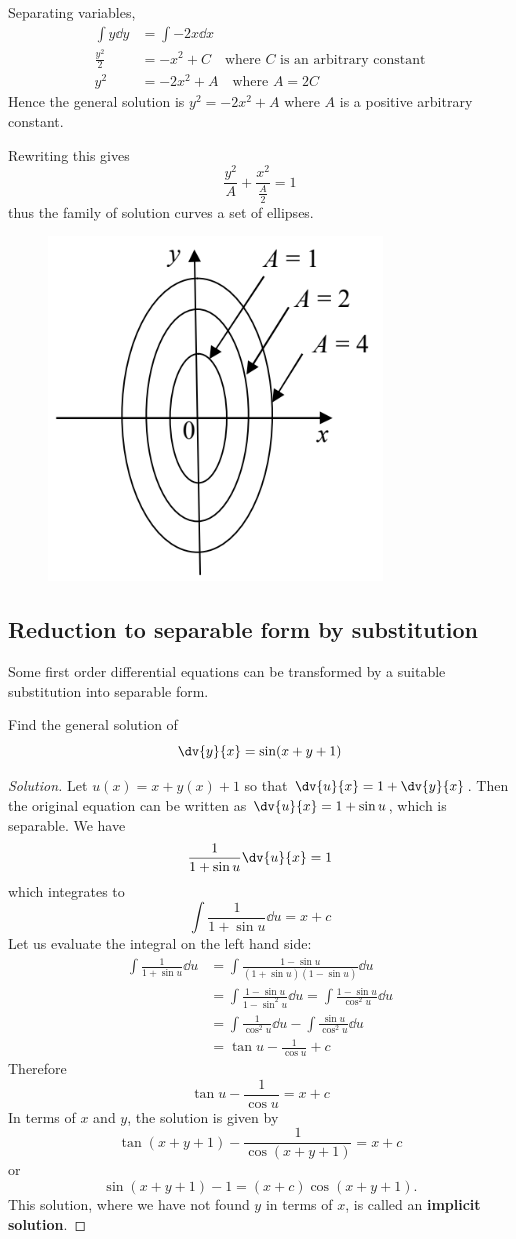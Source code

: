 \begin{solution}
Separating variables,
\begin{align*}
\int y\dd{y}&=\int-2x\dd{x}\\
\frac{y^2}{2}&=-x^2+C\quad\text{where $C$ is an arbitrary constant}\\
y^2&=-2x^2+A\quad\text{where $A=2C$}
\end{align*}
Hence the general solution is $y^2=-2x^2+A$ where $A$ is a positive arbitrary constant.

Rewriting this gives 
\[ \frac{y^2}{A}+\frac{x^2}{\frac{A}{2}}=1 \]
thus the family of solution curves a set of ellipses.

\begin{figure}[H]
    \centering
    \includegraphics[width=0.3\linewidth]{images/family-soln.png}
\end{figure}
\end{solution}

\subsection{Reduction to separable form by substitution}
Some first order differential equations can be transformed by a suitable substitution into separable form.

\begin{exercise}{}{}
Find the general solution of
\[ \dv{y}{x} = \sin(x+y+1) \]
\end{exercise}

\begin{proof}[Solution]
Let $u(x) = x + y(x) + 1$ so that $\dv{u}{x} = 1 + \dv{y}{x}$. Then the original equation can be written as $\dv{u}{x} = 1 + \sin u$, which is separable. We have
\[ \frac{1}{1+\sin u}\dv{u}{x} = 1 \]
which integrates to
\[ \int \frac{1}{1+\sin u} \dd{u} = x+c \]
Let us evaluate the integral on the left hand side:
\begin{align*}
\int \frac{1}{1+\sin u} \dd{u}
&= \int \frac{1-\sin u}{(1+\sin u)(1-\sin u)} \dd{u} \\
&= \int \frac{1-\sin u}{1-\sin^2u} \dd{u} = \int \frac{1-\sin u}{\cos^2u} \dd{u} \\
&= \int \frac{1}{\cos^2u} \dd{u} - \int \frac{\sin u}{\cos^2u} \dd{u} \\
&= \tan u - \frac{1}{\cos u} + c
\end{align*}
Therefore 
\[ \tan u - \frac{1}{\cos u} = x+c \]
In terms of $x$ and $y$, the solution is given by
\[ \tan (x+y+1) - \frac{1}{\cos (x+y+1)} = x+c \]
or
\[ \sin (x+y+1) - 1 = (x+c) \cos (x+y+1). \]
This solution, where we have not found $y$ in terms of $x$, is called an \textbf{implicit solution}.
\end{proof}

